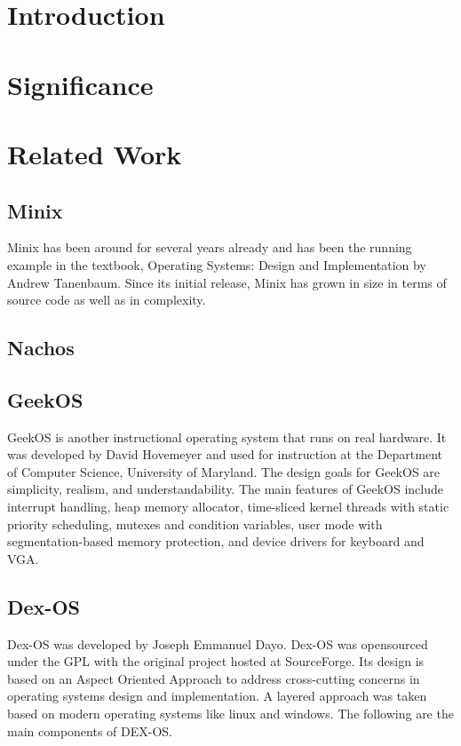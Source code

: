 \documentclass{acm_proc_article-sp}
\begin{document}
\section{Introduction}

\section{Significance}

\section{Related Work}

\subsection{Minix}
Minix has been around for several years already and has been the running 
example in the textbook, Operating Systems: Design and Implementation by 
Andrew Tanenbaum. Since its initial release, Minix has grown in size in terms
of source code as well as in complexity. 

\subsection{Nachos}

\subsection{GeekOS}

GeekOS is another instructional operating system that runs on real hardware. 
It was developed by David Hovemeyer and used for instruction at the Department 
of Computer Science, University of Maryland. The design goals for GeekOS are
simplicity, realism, and understandability. The main features of GeekOS include interrupt handling, heap memory allocator, time-sliced kernel threads with 
static priority scheduling, mutexes and condition variables, user mode 
with segmentation-based memory protection, and device drivers for keyboard 
and VGA.


\subsection{Dex-OS}
Dex-OS was developed by Joseph Emmanuel Dayo. Dex-OS was opensourced under 
the GPL with the original project hosted at SourceForge. Its design is based on
an Aspect Oriented Approach to address cross-cutting concerns in operating 
systems design and implementation. A layered approach was taken based on 
modern operating systems like linux and windows. The following are the main
components of DEX-OS.
\end{document}
